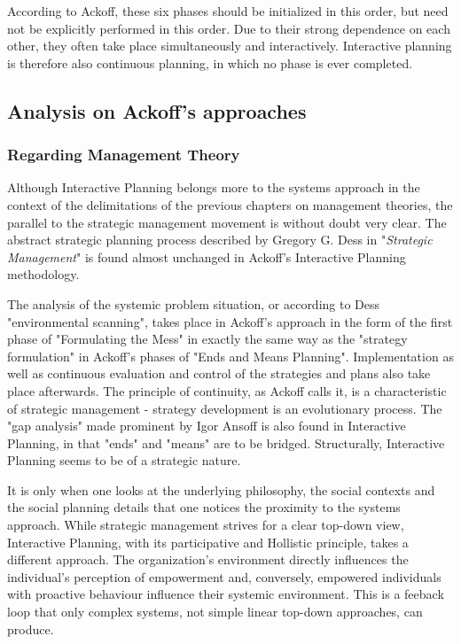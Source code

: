 \documentclass[a4paper,12pt]{scrartcl}
\begin{document}
According to Ackoff, these six phases should be initialized in this order, but need not be explicitly performed in this order. Due to their strong dependence on each other, they often take place simultaneously and interactively. Interactive planning is therefore also continuous planning, in which no phase is ever completed.	


\subsection{Analysis on Ackoff's approaches}

\subsubsection{Regarding Management Theory}	

Although Interactive Planning belongs more to the systems approach in the context of the delimitations of the previous chapters on management theories, the parallel to the strategic management movement is without doubt very clear. The abstract strategic planning process described by Gregory G. Dess in "\textit{Strategic Management}"\cite{dess:1993} is found almost unchanged in Ackoff's Interactive Planning methodology.

The analysis of the systemic problem situation, or according to Dess "environmental scanning", takes place in Ackoff's approach in the form of the first phase of "Formulating the Mess" in exactly the same way as the "strategy formulation" in Ackoff's phases of "Ends and Means Planning". Implementation as well as continuous evaluation and control of the strategies and plans also take place afterwards. The principle of continuity, as Ackoff calls it, is a characteristic of strategic management - strategy development is an evolutionary process. The "gap analysis" made prominent by Igor Ansoff is also found in Interactive Planning, in that "ends" and "means" are to be bridged. Structurally, Interactive Planning seems to be of a strategic nature. 

It is only when one looks at the underlying philosophy, the social contexts and the social planning details that one notices the proximity to the systems approach. While strategic management strives for a clear top-down view, Interactive Planning, with its participative and Hollistic principle, takes a different approach. The organization's environment directly influences the individual's perception of empowerment and, conversely, empowered individuals with proactive behaviour influence their systemic    \linebreak        environment.\cite{wilbon:2012} This is a feeback loop that only complex systems, not simple linear top-down approaches, can produce.
\end{document}
